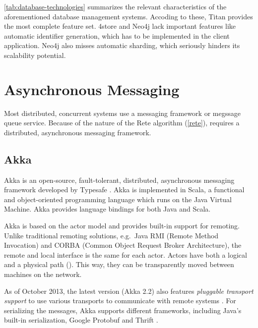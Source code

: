 \autoref{tab:database-technologies} summarizes the relevant characteristics of the aforementioned database management systems. Accoding to these, Titan provides the most complete feature set. 4store and Neo4j lack important features like automatic identifier generation, which has to be implemented in the client application. Neo4j also misses automatic sharding, which seriously hinders its scalability potential. 


\section{Asynchronous Messaging}

Most distributed, concurrent systems use a messaging framework or megssage queue service. Because of the nature of the Rete algorithm (\autoref{rete}), \iqd{} requires a distributed, asynchronous messaging framework.

\subsection{Akka}
\label{subsec:akka}

Akka is an open-source, fault-tolerant, distributed, asynchronous messaging framework developed by Typesafe \cite{Akka}.
Akka is implemented in Scala, a functional and object-oriented programming language which runs on the Java Virtual Machine. Akka provides language bindings for both Java and Scala.


Akka is based on the actor model \cite{Hewitt:1973:UMA:1624775.1624804} and provides built-in support for remoting. Unlike traditional remoting solutions, e.g.\ Java RMI (Remote Method Invocation) and CORBA (Common Object Request Broker Architecture), the remote and local interface is the same for each actor. Actors have both a logical and a physical path (). This way, they can be transparently moved between machines on the network.

As of October 2013, the latest version (Akka 2.2) also features \textit{pluggable transport support} to use various transports to communicate with remote systems \cite{Akka}. For serializing the messages, Akka supports different frameworks, including Java's built-in serialization, Google Protobuf \cite{Protobuf} and Thrift \cite{Thrift}.


